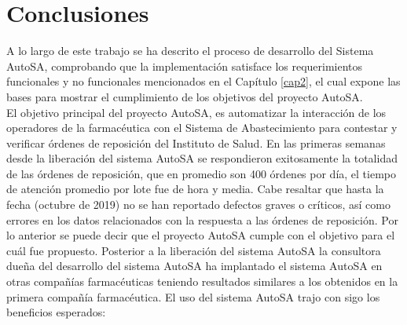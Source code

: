 \chapter{Conclusiones}\label{cap5}

A lo largo de este trabajo se ha descrito el proceso de desarrollo del Sistema AutoSA, comprobando que la implementación satisface los requerimientos funcionales y no funcionales mencionados en el Capítulo \ref{cap2}, el cual expone las bases para mostrar el cumplimiento de los objetivos del proyecto AutoSA.\\
El objetivo principal del proyecto AutoSA, es automatizar la interacción de los operadores de la farmacéutica con el Sistema de Abastecimiento para contestar y verificar órdenes de reposición del Instituto de Salud. En las primeras semanas desde la liberación del sistema AutoSA se respondieron exitosamente la totalidad de las órdenes de reposición, que en promedio son 400 órdenes por día, el tiempo de atención promedio por lote fue de hora y media. Cabe resaltar que hasta la fecha (octubre de 2019) no se han reportado defectos graves o críticos, así como errores en los datos relacionados con la respuesta a las órdenes de reposición. Por lo anterior se puede decir que el proyecto AutoSA cumple con el objetivo para el cuál fue propuesto. Posterior a la liberación del sistema AutoSA la consultora dueña del desarrollo del sistema AutoSA ha implantado el sistema AutoSA en otras compañías farmacéuticas teniendo resultados similares a los obtenidos en la primera compañía farmacéutica. El uso del sistema AutoSA trajo con sigo los beneficios esperados:

